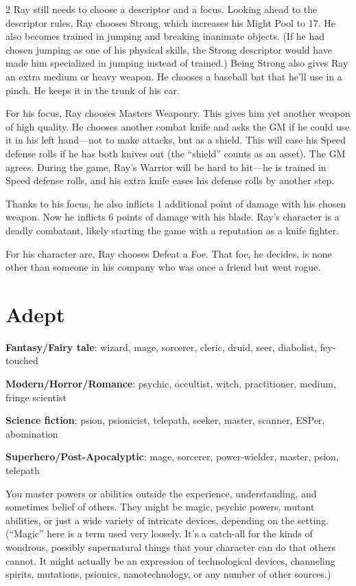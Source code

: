 \begin{multicols}{2}
Ray still needs to choose a descriptor and a focus. Looking ahead to the descriptor rules, Ray chooses Strong, which increases his Might Pool to 17. He also becomes trained in jumping and breaking inanimate objects. (If he had chosen jumping as one of his physical skills, the Strong descriptor would have made him specialized in jumping instead of trained.) Being Strong also gives Ray an extra medium or heavy weapon. He chooses a baseball bat that he’ll use in a pinch. He keeps it in the trunk of his car.

For his focus, Ray chooses Masters Weaponry. This gives him yet another weapon of high quality. He chooses another combat knife and asks the GM if he could use it in his left hand—not to make attacks, but as a shield. This will ease his Speed defense rolls if he has both knives out (the “shield” counts as an asset). The GM agrees. During the game, Ray’s Warrior will be hard to hit—he is trained in Speed defense rolls, and his extra knife eases his defense rolls by another step.

Thanks to his focus, he also inflicts 1 additional point of damage with his chosen weapon. Now he inflicts 6 points of damage with his blade. Ray’s character is a deadly combatant, likely starting the game with a reputation as a knife fighter.

For his character arc, Ray chooses Defeat a Foe. That foe, he decides, is none other than someone in his company who was once a friend but went rogue.

\section{Adept}
\textbf{Fantasy/Fairy tale}: wizard, mage, sorcerer, cleric, druid, seer, diabolist, fey-touched

\textbf{Modern/Horror/Romance}: psychic, occultist, witch, practitioner, medium, fringe scientist

\textbf{Science fiction}: psion, psionicist, telepath, seeker, master, scanner, ESPer, abomination

\textbf{Superhero/Post-Apocalyptic}: mage, sorcerer, power-wielder, master, psion, telepath

You master powers or abilities outside the experience, understanding, and sometimes belief of others. They might be magic, psychic powers, mutant abilities, or just a wide variety of intricate devices, depending on the setting. (“Magic” here is a term used very loosely. It’s a catch-all for the kinds of wondrous, possibly supernatural things that your character can do that others cannot. It might actually be an expression of technological devices, channeling spirits, mutations, psionics, nanotechnology, or any number of other sources.)


\end{multicols}
